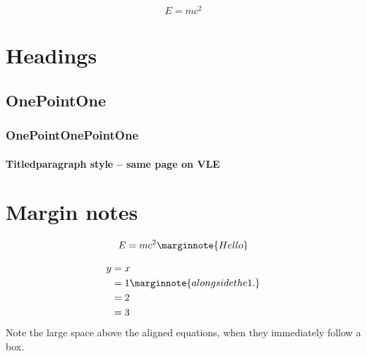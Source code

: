 \documentclass[solutionsatend,twocolumnsolutions]{ouunit}
\author{Robert Hasson}
\newenvironment{highlight}[1][]{\begin{style2box}[#1]}{\end{style2box}}
\begin{document}
\makefrontpages
\introduction
\lipsum[133] 

\[
E=mc^2
\]
\lipsum[133]
\section{Headings}
\lipsum[133]
\subsection{OnePointOne}
\lipsum[133]
\subsubsection{OnePointOnePointOne}
\lipsum[133]
\paragraph{Titledparagraph style -- same page on VLE}
\lipsum[133]
\section{Margin notes}
\begin{highlight}
\lipsum[133]

\lipsum[133]
\[
E=mc^2\marginnote{Hello}
\]
\end{highlight}
\lipsum[133]
\begin{highlight}
\lipsum[133]
\end{highlight}
\begin{align*}
y &=x\\
&=1\marginnote{alongside the 1.}\\
&=2\\
&=3
\end{align*}
Note the large space above the aligned equations, when they immediately follow a box.
\begin{highlight}[Title]
\lipsum[133]
\end{highlight}
\end{document}
